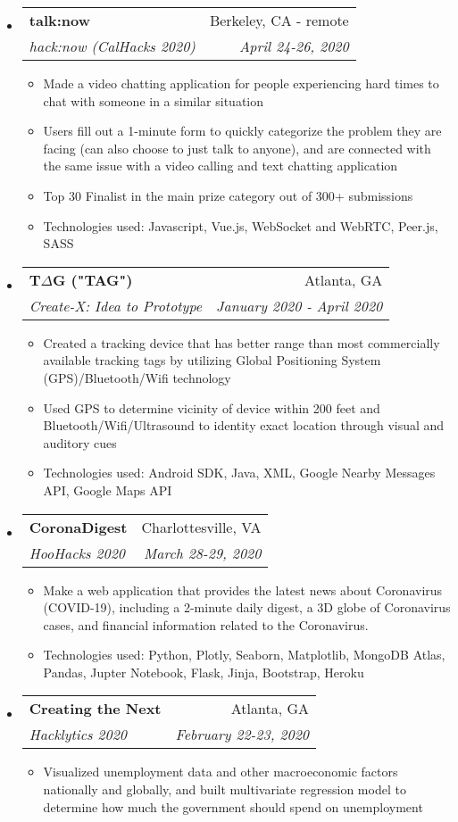 \documentclass[letterpaper,11pt]{article}
\makeatletter
\newcommand{\resitem}[1]{\item #1 \vspace{-2pt}}
\newcommand{\ressubheading}[4]{
\begin{tabular*}{7.0in}{l@{\extracolsep{\fill}}r}
		\textbf{#1} & #2 \\
		\textit{#3} & \textit{#4} \\
\end{tabular*}\vspace{-6pt}}
\makeatother
\begin{document}
\begin{itemize}
\begin{itemize}
    \end{itemize}
\item
    \ressubheading{talk:now}{Berkeley, CA - remote}{hack:now (CalHacks 2020)}{April 24-26, 2020}
    \begin{itemize}
        \resitem{Made a video chatting application for people experiencing hard times to chat with someone in a similar situation}
        \resitem{Users fill out a 1-minute form to quickly categorize the problem they are facing (can also choose to just talk to anyone), and are connected with the same issue with a video calling and text chatting application}
        \resitem{Top 30 Finalist in the main prize category out of 300+ submissions}
        \resitem{Technologies used: Javascript, Vue.js, WebSocket and WebRTC, Peer.js, SASS}
    \end{itemize}
\item
    \ressubheading{T$\Delta$G ("TAG")}{Atlanta, GA}{Create-X: Idea to Prototype}{January 2020 - April 2020}
    \begin{itemize}
        \resitem{Created a tracking device that has better range than most commercially available tracking tags by utilizing Global Positioning System (GPS)/Bluetooth/Wifi technology}
        \resitem{Used GPS to determine vicinity of device within 200 feet and Bluetooth/Wifi/Ultrasound to identity exact location through visual and auditory cues}
        \resitem{Technologies used: Android SDK, Java, XML, Google Nearby Messages API, Google Maps API}
    \end{itemize}
\item
    \ressubheading{CoronaDigest}{Charlottesville, VA}{HooHacks 2020}{March 28-29, 2020}
    \begin{itemize}
        \resitem{Make a web application that provides the latest news about Coronavirus (COVID-19), including a 2-minute daily digest, a 3D globe of Coronavirus cases, and financial information related to the Coronavirus.}
        \resitem{Technologies used: Python, Plotly, Seaborn, Matplotlib, MongoDB Atlas, Pandas, Jupter Notebook, Flask, Jinja, Bootstrap, Heroku}
    \end{itemize}
\item
    \ressubheading{Creating the Next}{Atlanta, GA}{Hacklytics 2020}{February 22-23, 2020}
    \begin{itemize}
        \resitem{Visualized unemployment data and other macroeconomic factors nationally and globally, and built multivariate regression model to determine how much the government should spend on unemployment}

\end{itemize}
\end{itemize}
\end{document}
